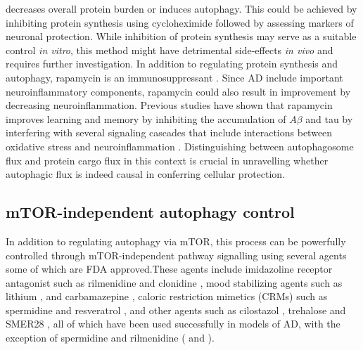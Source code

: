 decreases overall protein burden or induces autophagy. This could be achieved by inhibiting protein synthesis using cycloheximide \citep{Watanabe-Asano2014} followed by assessing markers of neuronal protection. While inhibition of protein synthesis may serve as a suitable control \textit{in vitro}, this method might have detrimental side-effects \textit{in vivo} and requires further investigation. In addition to regulating protein synthesis and autophagy, rapamycin is an immunosuppressant \citep{Khanna2000,Mohacsi1992,Wicker1990}. Since AD include important neuroinflammatory components, rapamycin could also result in improvement by decreasing neuroinflammation. Previous studies have shown that rapamycin improves learning and memory by inhibiting the accumulation of $A\beta$ and tau by interfering with several signaling cascades \citep{Liu2013,Liu2013a,Maiese2012} that include interactions between oxidative stress and neuroinflammation \citep{Agostinho2010,Galimberti2011}. Distinguishing between autophagosome flux and protein cargo flux in this context is crucial in unravelling whether autophagic flux is indeed causal in conferring cellular protection. 

\subsection{mTOR-independent autophagy control}
In addition to regulating autophagy via mTOR, this process can be powerfully controlled through mTOR-independent pathway signalling using several agents some of which are FDA approved.These agents include imidazoline receptor antagonist such as rilmenidine and clonidine \citep{Rose2010,Williams2008}, mood stabilizing agents such as lithium \citep{Shimada2012,Zhang2011}, and carbamazepine \citep{Li2013,Zhang2017}, caloric restriction mimetics (CRMs) such as spermidine \citep{Buttner2014,Wang2012} and resveratrol \citep{Lee2015}, and other agents such as cilostazol \citep{Lee2015}, trehalose \citep{Rodriguez-Navarro2010,Schaeffer2012,Kruger2012} and SMER28 \citep{Tian2011}, all of which have been used successfully in models of AD, with the exception of spermidine and rilmenidine ( and ).

